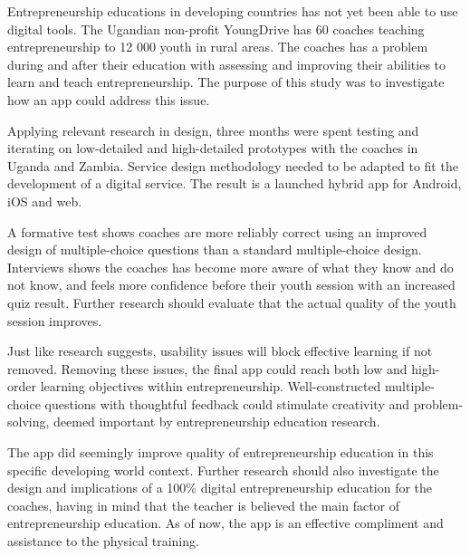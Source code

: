 
Entrepreneurship educations in developing countries has not yet been able to use digital tools. The Ugandian non-profit YoungDrive has 60 coaches teaching entrepreneurship to 12 000 youth in rural areas. The coaches has a problem during and after their education with assessing and improving their abilities to learn and teach entrepreneurship. The purpose of this study was to investigate how an app could address this issue.

Applying relevant research in design, three months were spent testing and iterating on low-detailed and high-detailed prototypes with the coaches in Uganda and Zambia. Service design methodology needed to be adapted to fit the development of a digital service. The result is a launched hybrid app for Android, iOS and web.

A formative test shows coaches are more reliably correct using an improved design of multiple-choice questions than a standard multiple-choice design. Interviews shows the coaches has become more aware of what they know and do not know, and feels more confidence before their youth session with an increased quiz result. Further research should evaluate that the actual quality of the youth session improves.

Just like research suggests, usability issues will block effective learning if not removed. Removing these issues, the final app could reach both low and high-order learning objectives within entrepreneurship. Well-constructed multiple-choice questions with thoughtful feedback could stimulate creativity and problem-solving, deemed important by entrepreneurship education research.

The app did seemingly improve quality of entrepreneurship education in this specific developing world context. Further research should also investigate the design and implications of a 100\% digital entrepreneurship education for the coaches, having in mind that the teacher is believed the main factor of entrepreneurship education. As of now, the app is an effective compliment and assistance to the physical training.
